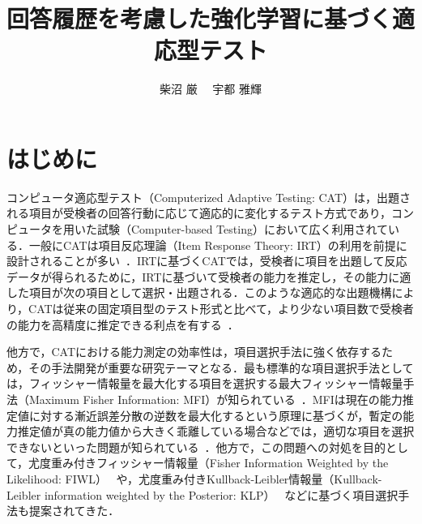 \documentclass[dvipdfmx,a4j]{jarticle}
\begin{document}
\title{回答履歴を考慮した強化学習に基づく適応型テスト}

\author{柴沼 厳 \ \ 宇都 雅輝}



\maketitle
\thispagestyle{empty}

\section{はじめに}\label{sec:intro}

コンピュータ適応型テスト（Computerized Adaptive Testing: CAT）は，出題される項目が受検者の回答行動に応じて適応的に変化するテスト方式であり，コンピュータを用いた試験（Computer-based Testing）において広く利用されている．一般にCATは項目反応理論（Item Response Theory: IRT）の利用を前提に設計されることが多い~\cite{vanderlinden2016}．IRTに基づくCATでは，受検者に項目を出題して反応データが得られるために，IRTに基づいて受検者の能力を推定し，その能力に適した項目が次の項目として選択・出題される．このような適応的な出題機構により，CATは従来の固定項目型のテスト形式と比べて，より少ない項目数で受検者の能力を高精度に推定できる利点を有する~\cite{frey2023,wainer2000}．

他方で，CATにおける能力測定の効率性は，項目選択手法に強く依存するため，その手法開発が重要な研究テーマとなる．最も標準的な項目選択手法としては，フィッシャー情報量を最大化する項目を選択する最大フィッシャー情報量手法（Maximum Fisher Information: MFI）が知られている~\cite{lord1980}．MFIは現在の能力推定値に対する漸近誤差分散の逆数を最大化するという原理に基づくが，暫定の能力推定値が真の能力値から大きく乖離している場合などでは，適切な項目を選択できないといった問題が知られている~\cite{chang1996}．他方で，この問題への対処を目的として，尤度重み付きフィッシャー情報量（Fisher Information Weighted by the Likelihood: FIWL）~\cite{veerkamp1997} や，尤度重み付きKullback-Leibler情報量（Kullback-Leibler information weighted by the Posterior: KLP）~\cite{chang1996} などに基づく項目選択手法も提案されてきた．
\end{document}
